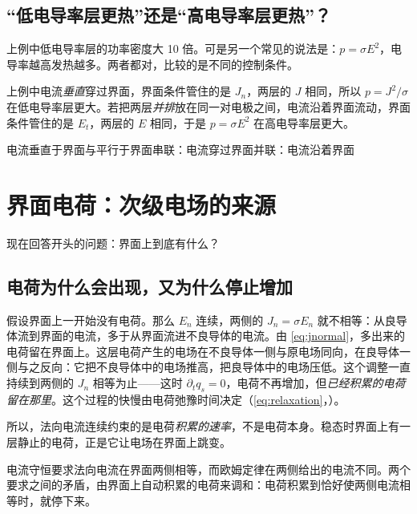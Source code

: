 \subsection{“低电导率层更热”还是“高电导率层更热”？}
上例中低电导率层的功率密度大 10 倍。可是另一个常见的说法是：$p=\sigma E^2$，电导率越高发热越多。两者都对，比较的是不同的控制条件。

上例中电流\emph{垂直}穿过界面，界面条件管住的是 $J_n$，两层的 $J$ 相同，所以 $p=J^2/\sigma$ 在低电导率层更大。若把两层\emph{并排}放在同一对电极之间，电流沿着界面流动，界面条件管住的是 $E_t$，两层的 $E$ 相同，于是 $p=\sigma E^2$ 在高电导率层更大。

\begin{compare}{电流垂直于界面与平行于界面}{串联：电流穿过界面}{并联：电流沿着界面}
\end{compare}

\section{界面电荷：次级电场的来源}\label{sec:interfaces-surfacecharge}

现在回答开头的问题：界面上到底有什么？

\subsection{电荷为什么会出现，又为什么停止增加}
假设界面上一开始没有电荷。那么 $E_n$ 连续，两侧的 $J_n=\sigma E_n$ 就不相等：从良导体流到界面的电流，多于从界面流进不良导体的电流。由 \eqref{eq:jnormal}，多出来的电荷留在界面上。这层电荷产生的电场在不良导体一侧与原电场同向，在良导体一侧与之反向：它把不良导体中的电场推高，把良导体中的电场压低。这个调整一直持续到两侧的 $J_n$ 相等为止——这时 $\partial_tq_s=0$，电荷不再增加，但\emph{已经积累的电荷留在那里}。这个过程的快慢由电荷弛豫时间决定（\eqref{eq:relaxation}，）。

所以，法向电流连续约束的是电荷\emph{积累的速率}，不是电荷本身。稳态时界面上有一层静止的电荷，正是它让电场在界面上跳变。

\begin{intuition}[界面电荷是一个自动调节阀]
电流守恒要求法向电流在界面两侧相等，而欧姆定律在两侧给出的电流不同。两个要求之间的矛盾，由界面上自动积累的电荷来调和：电荷积累到恰好使两侧电流相等时，就停下来。
\end{intuition}

